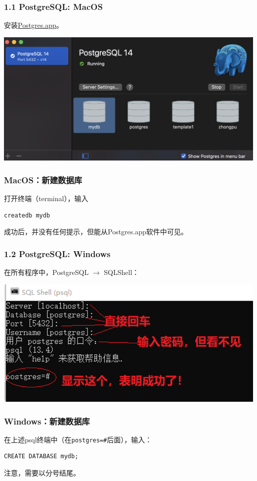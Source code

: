 \documentclass[aspectratio=169, 14pt]{beamer}
\begin{document}
\begin{frame}
    \frametitle{1.1 PostgreSQL: MacOS}
    安装\href{https://postgresapp.com/}{Postgres.app}。

    \includegraphics[width=.8\textwidth]{week4/pg-mac}

\end{frame}

\begin{frame}[fragile]
    \frametitle{MacOS：新建数据库}
    
    打开终端（terminal），输入

    \begin{verbatim}
createdb mydb
    \end{verbatim}

成功后，并没有任何提示，但能从Postgres.app软件中可见。
\end{frame}

\begin{frame}
    \frametitle{1.2 PostgreSQL: Windows}
    在所有程序中，PostgreSQL $\rightarrow$ SQLShell：

    \includegraphics[width=.8\textwidth]{week4/pg-windows}
\end{frame}

\begin{frame}[fragile]
    \frametitle{Windows：新建数据库}
在上述psql终端中（在\texttt{postgres=\#}后面），输入：

\begin{verbatim}
CREATE DATABASE mydb; 
\end{verbatim}

注意，需要以分号结尾。
\end{frame}
\end{document}
